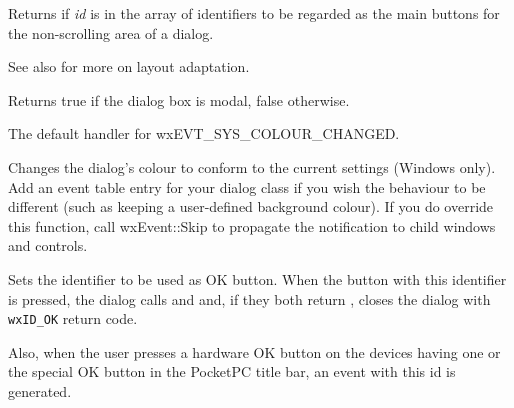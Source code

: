 \label{wxdialogismainbutton}


Returns \true if {\it id} is in the array of identifiers to be regarded as the main buttons for the non-scrolling area of a dialog.

See also  for more on layout adaptation.


\label{wxdialogismodal}


Returns true if the dialog box is modal, false otherwise.



\label{wxdialogonsyscolourchanged}


The default handler for wxEVT\_SYS\_COLOUR\_CHANGED.




Changes the dialog's colour to conform to the current settings (Windows only).
Add an event table entry for your dialog class if you wish the behaviour
to be different (such as keeping a user-defined
background colour). If you do override this function, call wxEvent::Skip to
propagate the notification to child windows and controls.




\label{wxdialogsetaffirmativeid}


Sets the identifier to be used as OK button. When the button with this
identifier is pressed, the dialog calls  
and  
and, if they both return \true, closes the dialog with \texttt{wxID\_OK} return
code.

Also, when the user presses a hardware OK button on the devices having one or
the special OK button in the PocketPC title bar, an event with this id is
generated.

